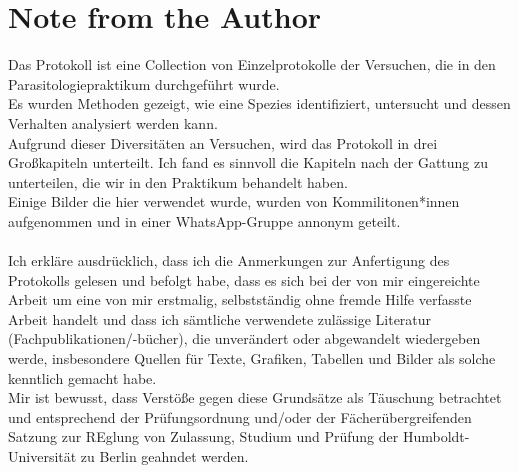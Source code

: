 \documentclass[oneside,10pt,a4paper]{report}
\begin{document}
	
	\tableofcontents
	\chapter{Note from the Author}
	Das Protokoll ist eine Collection von Einzelprotokolle der Versuchen, die in den Parasitologiepraktikum durchgeführt wurde.\\
	Es wurden Methoden gezeigt, wie eine Spezies identifiziert, untersucht und dessen Verhalten analysiert werden kann.\\
	Aufgrund dieser Diversitäten an Versuchen, wird das Protokoll in drei Großkapiteln unterteilt. Ich fand es sinnvoll die Kapiteln nach der Gattung zu unterteilen, die wir in den Praktikum behandelt haben.\\
	Einige Bilder die hier verwendet wurde, wurden von Kommilitonen*innen aufgenommen und in einer WhatsApp-Gruppe annonym geteilt.\\
	\\
	Ich erkläre ausdrücklich, dass ich die Anmerkungen zur Anfertigung des Protokolls gelesen und befolgt habe, dass es sich bei der von mir eingereichte Arbeit um eine von mir erstmalig, selbstständig ohne fremde Hilfe verfasste Arbeit handelt und dass ich sämtliche verwendete zulässige Literatur (Fachpublikationen/-bücher), die unverändert oder abgewandelt wiedergeben werde, insbesondere Quellen für Texte, Grafiken, Tabellen und Bilder als solche kenntlich gemacht habe.\\
	Mir ist bewusst, dass Verstöße gegen diese Grundsätze als Täuschung betrachtet und entsprechend der Prüfungsordnung und/oder der Fächerübergreifenden Satzung zur REglung von Zulassung, Studium und Prüfung der Humboldt-Universität zu Berlin geahndet werden.
	
	
\end{document}
